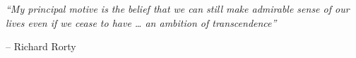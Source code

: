 \thispagestyle{empty}
\begin{center}
\large{\textit{``My principal motive is the belief that we can still make admirable sense of our lives even if we cease to have … an ambition of transcendence''}}
\end{center}
\begin{flushright}
-- Richard Rorty
\end{flushright}




\clearpage
